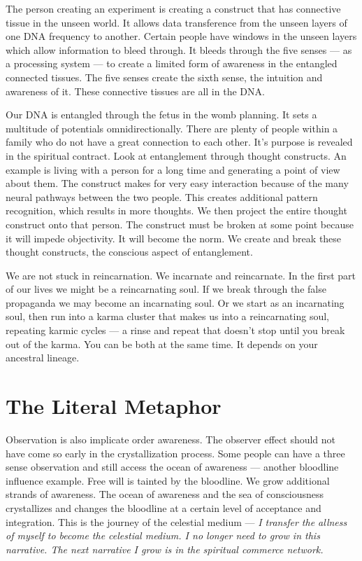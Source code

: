 \documentclass[letterpaper,9pt,twoside,titlepage,onecolumn,openany]{book}
\begin{document}
The person creating an experiment is creating a construct that has
connective tissue in the unseen world. It allows data transference from
the unseen layers of one DNA frequency to another. Certain people have
windows in the unseen layers which allow information to bleed through.
It bleeds through the five senses --- as a processing system --- to
create a limited form of awareness in the entangled connected tissues.
The five senses create the sixth sense, the intuition and awareness of
it. These connective tissues are all in the DNA.

Our DNA is entangled through the fetus in the womb planning. It sets a
multitude of potentials omnidirectionally. There are plenty of people
within a family who do not have a great connection to each other. It's
purpose is revealed in the spiritual contract. Look at entanglement
through thought constructs. An example is living with a person for a
long time and generating a point of view about them. The construct makes
for very easy interaction because of the many neural pathways between
the two people. This creates additional pattern recognition, which
results in more thoughts. We then project the entire thought construct
onto that person. The construct must be broken at some point because it
will impede objectivity. It will become the norm. We create and break
these thought constructs, the conscious aspect of entanglement.

We are not stuck in reincarnation. We incarnate and reincarnate. In the
first part of our lives we might be a reincarnating soul. If we break
through the false propaganda we may become an incarnating soul. Or we
start as an incarnating soul, then run into a karma cluster that makes
us into a reincarnating soul, repeating karmic cycles --- a rinse and
repeat that doesn't stop until you break out of the karma. You can be
both at the same time. It depends on your ancestral lineage.

\section*{The Literal Metaphor}\label{the-literal-metaphor}

Observation is also implicate order awareness. The observer effect
should not have come so early in the crystallization process. Some
people can have a three sense observation and still access the ocean of
awareness --- another bloodline influence example. Free will is tainted
by the bloodline. We grow additional strands of awareness. The ocean of
awareness and the sea of consciousness crystallizes and changes the
bloodline at a certain level of acceptance and integration. This is the
journey of the celestial medium --- \emph{I transfer the allness of
myself to become the celestial medium. I no longer need to grow in this
narrative. The next narrative I grow is in the spiritual commerce
network.}
\end{document}
